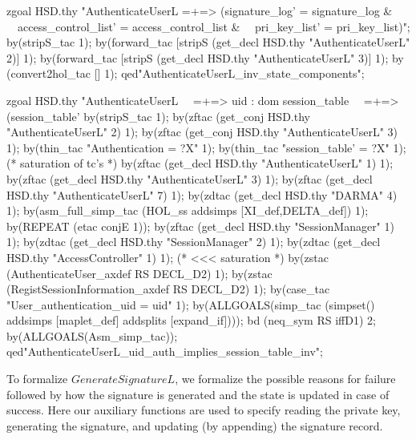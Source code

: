 \documentclass[a4paper,pdftex]{article}
\newenvironment{holz-proof}{\comment}{\endcomment}
\begin{document}
\begin{holz-proof}

zgoal HSD.thy 
"AuthenticateUserL =+=> (signature_log' =  signature_log &            \
\                        access_control_list' = access_control_list & \
\                        pri_key_list' = pri_key_list)";
by(stripS_tac 1);
by(forward_tac [stripS (get_decl HSD.thy "AuthenticateUserL" 2)] 1);
by(forward_tac [stripS (get_decl HSD.thy "AuthenticateUserL" 3)] 1);
by (convert2hol_tac [] 1); 
qed"AuthenticateUserL_inv_state_components";


zgoal HSD.thy 
"AuthenticateUserL                                                    \
\  =+=>  uid : dom session_table                                      \
\  =+=>  (session_table' %
by(stripS_tac 1);
by(zftac (get_conj HSD.thy "AuthenticateUserL" 2) 1);
by(zftac (get_conj HSD.thy "AuthenticateUserL" 3) 1);
by(thin_tac "Authentication = ?X" 1);
by(thin_tac "session_table' = ?X" 1);
(* saturation of tc's *)
by(zftac (get_decl HSD.thy "AuthenticateUserL" 1) 1);
by(zftac (get_decl HSD.thy "AuthenticateUserL" 3) 1);
by(zftac (get_decl HSD.thy "AuthenticateUserL" 7) 1);
by(zdtac (get_decl HSD.thy "DARMA" 4) 1);
by(asm_full_simp_tac (HOL_ss addsimps [XI_def,DELTA_def]) 1); 
by(REPEAT (etac conjE 1));
by(zftac (get_decl HSD.thy "SessionManager" 1) 1);
by(zdtac (get_decl HSD.thy "SessionManager" 2) 1);
by(zdtac (get_decl HSD.thy "AccessController" 1) 1);
(* <<< saturation *)
by(zstac (AuthenticateUser_axdef RS DECL_D2) 1);
by(zstac (RegistSessionInformation_axdef RS DECL_D2) 1);
by(case_tac "User_authentication_uid = uid" 1);
by(ALLGOALS(simp_tac (simpset() addsimps  [maplet_def]
                                addsplits [expand_if])));
bd (neq_sym RS iffD1) 2;
by(ALLGOALS(Asm_simp_tac));
qed"AuthenticateUserL_uid_auth_implies_session_table_inv";


\end{holz-proof}

To formalize $GenerateSignatureL$, we formalize the
possible reasons for failure followed by how the signature is generated
and the state is updated in case of success.  Here our auxiliary functions are
used to specify reading the private key, generating the signature, and
updating (by appending) the signature record.
\end{document}
